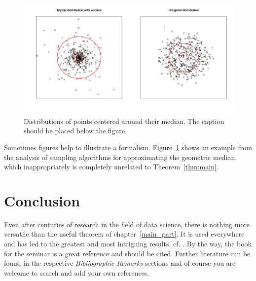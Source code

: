 \documentclass[a4paper,12pt]{article}
\begin{document}
\begin{figure}[t!]
	\centering
	\includegraphics[width=\textwidth]{median_distr}
	\caption{Distributions of points centered around their median. The caption should be placed below the figure.}
	\label{fig:median_distr}
\end{figure}


Sometimes figures help to illustrate a formalism. Figure~\ref{fig:median_distr} shows an example from the analysis of sampling algorithms for approximating the geometric median, which inappropriately is completely unrelated to Theorem~\ref{thm:main}.

\section{%
	Conclusion}
\label{conclusions}
Even after centuries of research in the field of data science, there is nothing more versatile than the useful theorem of chapter~\ref{main_part}. It is used everywhere and has led to the greatest and most intriguing results, cf. \cite{Someone03}. By the way, the book for the seminar \cite{SSBD14} is a great reference and should be cited. Further literature can be found in the respective \emph{Bibliographic Remarks} sections and of course you are welcome to search and add your own references.
\end{document}
